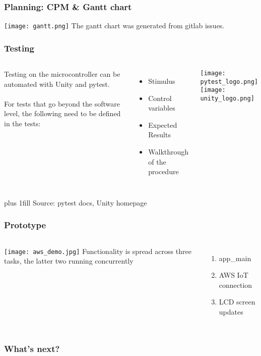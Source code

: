 \documentclass{beamer}
\begin{document}
\begin{frame}
  \frametitle{Planning: CPM \& Gantt chart}
  \texttt{[image: gantt.png]}
  The gantt chart was generated from gitlab issues.
\end{frame}

\begin{frame}
  \frametitle{Testing}

  \begin{columns}
    Testing on the microcontroller can be automated with Unity and pytest.
    \\~\\
    For tests that go beyond the software level, the following need to be defined in the tests:
    \begin{itemize}
      \item Stimulus
      \item Control variables
      \item Expected Results
      \item Walkthrough of the procedure
    \end{itemize}

    \texttt{[image: pytest\_logo.png]} \\
    \texttt{[image: unity\_logo.png]}

  \end{columns}
  \vskip0pt plus 1fill
  \hfill {\tiny Source: pytest docs, Unity homepage}
\end{frame}

\begin{frame}
  \frametitle{Prototype}
  \begin{columns}
    \texttt{[image: aws\_demo.jpg]}
    Functionality is spread across three tasks, the latter two running concurrently
    \begin{enumerate}
      \item app\_main
      \item AWS IoT connection
      \item LCD screen updates
    \end{enumerate}
  \end{columns}
\end{frame}

\begin{frame}
  \frametitle{What's next?}
\end{frame}
\end{document}
